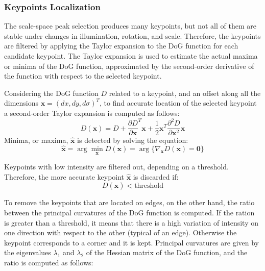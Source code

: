 \subsubsection{Keypoints Localization}
The scale-space peak selection produces many keypoints, but not all of them are 
stable under changes in illumination, rotation, and scale. Therefore, the 
keypoints are filtered by applying the Taylor expansion to the DoG function 
for each candidate keypoint. The Taylor expansion is used to estimate 
the actual maxima or minima of the DoG function, approximated by the 
second-order derivative of the function with respect to the selected keypoint.

Considering the DoG function $D$ related to a keypoint, and an offset 
along all the dimensions
$\boldsymbol{x} = (dx, dy, d\sigma)^T$, 
to find accurate location of the selected keypoint a second-order Taylor expansion 
is computed as follows:
\begin{equation}
    D(\boldsymbol{x}) = D + \frac{\partial D}{\partial \boldsymbol{x}}^T \boldsymbol{x} + 
    \frac{1}{2} \boldsymbol{x}^T \frac{\partial^2 D}{\partial \boldsymbol{x}^2} \boldsymbol{x}
    \label{eq:taylor_expansion}
\end{equation}
Minima, or maxima, $\boldsymbol{\hat{x}}$ is detected by solving the equation:
\begin{equation}
    \boldsymbol{\hat{x}} = \arg \min_{\boldsymbol{x}} D(\boldsymbol{x})
    = \arg \{ \nabla_{\boldsymbol{x}} D(\boldsymbol{x}) = \boldsymbol{0} \}
\end{equation}

Keypoints with low intensity are filtered out, depending on a threshold. Therefore, 
the more accurate keypoint $\boldsymbol{\hat{x}}$ is discarded if:
\begin{equation}
    D(\boldsymbol{\hat{x}}) < \text{threshold}
\label{eq:contrast_threshold}
\end{equation}

To remove the keypoints that are located on edges, on the other hand, the ratio 
between the principal curvatures of the DoG function is computed. 
If the ration is greater than a threshold, it means that there is a high variation 
of intensity on one direction with respect to the other (typical of an edge). 
Otherwise the keypoint corresponds to a corner and it is kept.
Principal curvatures are given by the eigenvalues $\lambda_1$ and $\lambda_2$
of the Hessian matrix of the 
DoG function, and the ratio is computed as follows:

